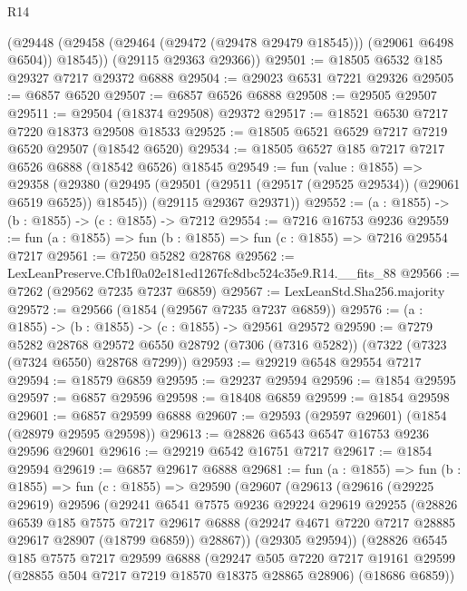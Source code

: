 \begin{lexlean}{R14}
\begin{coremodule}
        (@29448 (@29458 (@29464 (@29472 (@29478 @29479 @18545))) (@29061 @6498 @6504)) @18545))
      (@29115 @29363 @29366))
@29501 := @18505 @6532 @185 @29327 @7217 @29372 @6888
@29504 := @29023 @6531 @7221 @29326
@29505 := @6857 @6520
@29507 := @6857 @6526 @6888
@29508 := @29505 @29507
@29511 := @29504 (@18374 @29508) @29372
@29517 := @18521 @6530 @7217 @7220 @18373 @29508 @18533
@29525 := @18505 @6521 @6529 @7217 @7219 @6520 @29507 (@18542 @6520)
@29534 := @18505 @6527 @185 @7217 @7217 @6526 @6888 (@18542 @6526) @18545
@29549 := fun (value : @1855) =>
  @29358
    (@29380
      (@29495 (@29501 (@29511 (@29517 (@29525 @29534)) (@29061 @6519 @6525)) @18545))
      (@29115 @29367 @29371))
@29552 := (a : @1855) -> (b : @1855) -> (c : @1855) -> @7212
@29554 := @7216 @16753 @9236
@29559 := fun (a : @1855) => fun (b : @1855) => fun (c : @1855) => @7216 @29554 @7217
@29561 := @7250 @5282 @28768
@29562 := LexLeanPreserve.Cfb1f0a02e181ed1267fc8dbc524c35e9.R14.__fits_88
@29566 := @7262 (@29562 @7235 @7237 @6859)
@29567 := LexLeanStd.Sha256.majority
@29572 := @29566 (@1854 (@29567 @7235 @7237 @6859))
@29576 := (a : @1855) -> (b : @1855) -> (c : @1855) -> @29561 @29572
@29590 := @7279
    @5282
    @28768
    @29572
    @6550
    @28792
    (@7306 (@7316 @5282))
    (@7322 (@7323 (@7324 @6550) @28768 @7299))
@29593 := @29219 @6548 @29554 @7217
@29594 := @18579 @6859
@29595 := @29237 @29594
@29596 := @1854 @29595
@29597 := @6857 @29596
@29598 := @18408 @6859
@29599 := @1854 @29598
@29601 := @6857 @29599 @6888
@29607 := @29593 (@29597 @29601) (@1854 (@28979 @29595 @29598))
@29613 := @28826 @6543 @6547 @16753 @9236 @29596 @29601
@29616 := @29219 @6542 @16751 @7217
@29617 := @1854 @29594
@29619 := @6857 @29617 @6888
@29681 := fun (a : @1855) =>
  fun (b : @1855) =>
  fun (c : @1855) =>
  @29590
    (@29607
      (@29613
        (@29616
          (@29225 @29619)
          @29596
          (@29241
            @6541
            @7575
            @9236
            @29224
            @29619
            @29255
            (@28826
              @6539
              @185
              @7575
              @7217
              @29617
              @6888
              (@29247 @4671 @7220 @7217 @28885 @29617 @28907 (@18799 @6859))
              @28867))
          (@29305 @29594))
        (@28826
          @6545
          @185
          @7575
          @7217
          @29599
          @6888
          (@29247
            @505
            @7220
            @7217
            @19161
            @29599
            (@28855 @504 @7217 @7219 @18570 @18375 @28865 @28906)
            (@18686 @6859))

\end{coremodule}
\end{lexlean}
